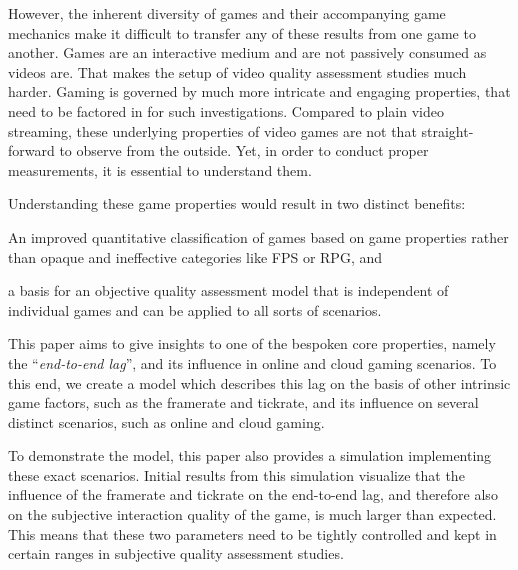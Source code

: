 However, the inherent diversity of games and their accompanying game mechanics make it difficult to transfer any of these results from one game to another. Games are an interactive medium and are not passively consumed as videos are. That makes the setup of video quality assessment studies much harder. Gaming is governed by much more intricate and engaging properties, that need to be factored in for such investigations. Compared to plain video streaming, these underlying properties of video games are not that straight-forward to observe from the outside. Yet, in order to conduct proper measurements, it is essential to understand them.

Understanding these game properties would result in two distinct benefits:
\begin{enumerate*}
	\item An improved quantitative classification of games based on game properties rather than opaque and ineffective categories like \gls{FPS} or \gls{RPG}, and
	\item a basis for an objective quality assessment model that is independent of individual games and can be applied to all sorts of scenarios.
\end{enumerate*}

This paper aims to give insights to one of the bespoken core properties, namely the ``\textit{end-to-end lag}'', and its influence in online and cloud gaming scenarios. To this end, we create a model which describes this lag on the basis of other intrinsic game factors, such as the framerate and tickrate, and its influence on several distinct scenarios, such as online and cloud gaming.

To demonstrate the model, this paper also provides a simulation implementing these exact scenarios. Initial results from this simulation visualize that the influence of the framerate and tickrate on the end-to-end lag, and therefore also on the subjective interaction quality of the game, is much larger than expected. This means that these two parameters need to be tightly controlled and kept in certain ranges %
in subjective quality assessment studies.





